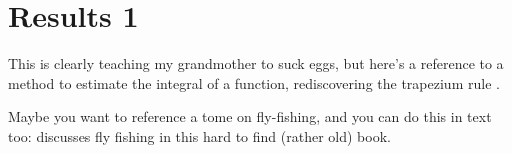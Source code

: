 \chapter{Results 1}

This is clearly teaching my grandmother to suck eggs, but here's a reference to a method to estimate the integral of a function, rediscovering the trapezium rule \citep{10.2337/diacare.17.2.152}.

Maybe you want to reference a tome on fly-fishing, and you can do this in text too: \citet{Hartley1991} discusses fly fishing in this hard to find (rather old) book.